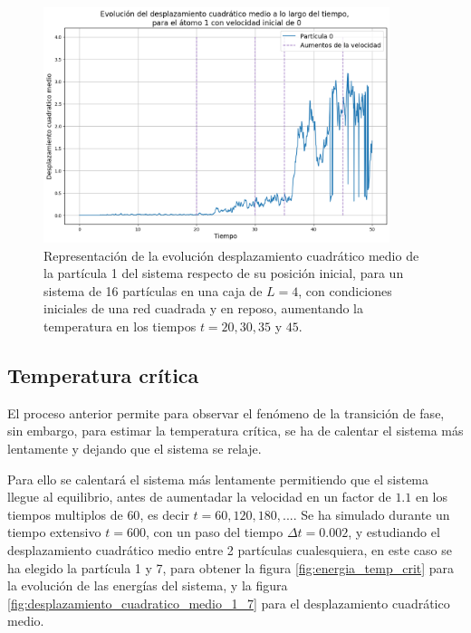 \documentclass[11pt, twoside]{article} %
\begin{document}
\begin{figure}[h!]
    \centering
    \includegraphics[width=0.9\textwidth]{plots/desplazamiento_1_particula.png}
    \caption{Representación de la evolución desplazamiento cuadrático medio de la 
    partícula 1 del sistema respecto de su posición inicial, para un sistema de 16 
    partículas en una caja de $L=4$, con condiciones iniciales de una red cuadrada 
    y en reposo, aumentando la temperatura en los tiempos $t=20, 30, 35$ y $45$.}
    \label{fig:desplazamiento_cuadratico_medio_1}
\end{figure}

\newpage

\subsection{Temperatura crítica}

El proceso anterior permite para observar el fenómeno de la transición de fase,
sin embargo, para estimar la temperatura crítica, se ha de calentar el sistema más 
lentamente y dejando que el sistema se relaje. 

Para ello se calentará el sistema más lentamente permitiendo que el sistema llegue al 
equilibrio, antes de aumentadar la velocidad en un factor de $1.1$ en los tiempos 
multiplos de $60$, es decir $t=60, 120, 180, ...$. Se ha simulado durante un tiempo 
extensivo $t=600$, con un paso del tiempo $\Delta t = 0.002$, y estudiando el 
desplazamiento cuadrático medio entre 2 partículas cualesquiera, en este
caso se ha elegido la partícula 1 y 7, para obtener la figura 
\ref{fig:energia_temp_crit} para la evolución de las energías del sistema, y la figura
\ref{fig:desplazamiento_cuadratico_medio_1_7} para el desplazamiento cuadrático medio.
\end{document}

